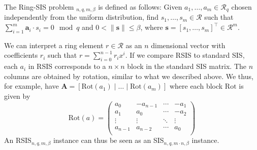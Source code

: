 
\begin{definition}
    The Ring-SIS problem $_{n, q, m, \beta}$ is defined as follows: Given $a_1, \ldots, a_m \in \mathcal{R}_q$ chosen independently from the uniform distribution, find $s_1, \ldots, s_m \in \mathcal{R}$ such that $\sum_{i=1}^m \mathbf{a}_i \cdot s_i = 0 \mod q$ and $0 < \| \mathbf{s}\| \leq \beta$, where $\mathbf{s} = \left[s_1, \ldots, s_m\right]^\intercal \in \mathcal{R}^m$.
\end{definition} %
We can interpret a ring element $r \in \mathcal{R}$ as an $n$ dimensional vector with coefficients $r_i$ such that $r = \sum_{i=0}^{n-1} r_i x^i$. If we compare RSIS to standard SIS, each $a_i$ in RSIS corresponds to a $n\times n$ block in the standard SIS matrix. The $n$ columns are obtained by rotation, similar to what we described above. We thus, for example, have $\mathbf{A} = [\text{Rot}(a_1)\mid \dots \mid \text{Rot}(a_m)]$ where each block $\text{Rot}$ is given by
\begin{equation*}
    \text{Rot}(a) = \begin{pmatrix}
        a_0     & -a_{n-1} & \cdots & -a_{1} \\
        a_1     & a_{0}    & \cdots & -a_{2} \\
        \vdots  & \vdots   & \ddots & \vdots \\
        a_{n-1} & a_{n-2}  & \cdots & a_{0}  \\
    \end{pmatrix}
\end{equation*}
An RSIS$_{n, q, m, \beta}$ instance can thus be seen as an SIS$_{n, q, m \cdot n, \beta}$ instance.

